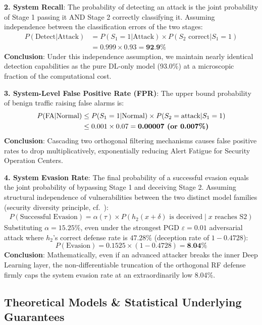 \documentclass[sigconf]{acmart}
\begin{document}
\textbf{2. System Recall}: The probability of detecting an attack is the joint probability of Stage 1 passing it AND Stage 2 correctly classifying it. Assuming independence between the classification errors of the two stages:
\begin{align*}
P(\text{Detect}|\text{Attack}) &= P(S_1=1|\text{Attack}) \times P(S_2 \text{ correct}|S_1=1) \\
                               &= 0.999 \times 0.93 = \textbf{92.9\%}
\end{align*}
\textbf{Conclusion}: Under this independence assumption, we maintain nearly identical detection capabilities as the pure DL-only model (93.0\%) at a microscopic fraction of the computational cost.

\textbf{3. System-Level False Positive Rate (FPR)}: The upper bound probability of benign traffic raising false alarms is:
\begin{align*}
P(\text{FA}|\text{Normal}) &\leq P(S_1=1|\text{Normal}) \times P(S_2=\text{attack}|S_1=1) \\
                           &\leq 0.001 \times 0.07 = \textbf{0.00007\ \text{(or 0.007\%)}}
\end{align*}
\textbf{Conclusion}: Cascading two orthogonal filtering mechanisms causes false positive rates to drop multiplicatively, exponentially reducing Alert Fatigue for Security Operation Centers.

\textbf{4. System Evasion Rate}: The final probability of a successful evasion equals the joint probability of bypassing Stage 1 and deceiving Stage 2. Assuming structural independence of vulnerabilities between the two distinct model families (security diversity principle, cf.\ \cite{22}):
\begin{align*}
P(\text{Successful Evasion}) = \alpha(\tau) \times P(h_2(x+\delta) \text{ is deceived} \mid x \text{ reaches S2})
\end{align*}
Substituting $\alpha=15.25\%$, even under the strongest PGD $\varepsilon=0.01$ adversarial attack where $h_2$'s correct defense rate is $47.28\%$ (deception rate of $1 - 0.4728$):
$$ P(\text{Evasion}) = 0.1525 \times (1 - 0.4728) = \textbf{8.04\%} $$
\textbf{Conclusion}: Mathematically, even if an advanced attacker breaks the inner Deep Learning layer, the non-differentiable truncation of the orthogonal RF defense firmly caps the system evasion rate at an extraordinarily low 8.04\%.

\subsection{Theoretical Models \& Statistical Underlying Guarantees}
\end{document}
